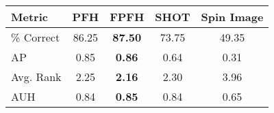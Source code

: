 \begin{tabular}{ | l || c | c | c | c | }
\hline
Metric & PFH & FPFH & SHOT & Spin Image \\
\hline
 \% Correct & 86.25 & \bf 87.50 & 73.75 & 49.35 \\
AP & 0.85 & \bf 0.86 & 0.64 & 0.31 \\
Avg. Rank & 2.25 & \bf 2.16 & 2.30 & 3.96 \\
AUH & 0.84 & \bf 0.85 & 0.84 & 0.65 \\
\hline
\end{tabular}